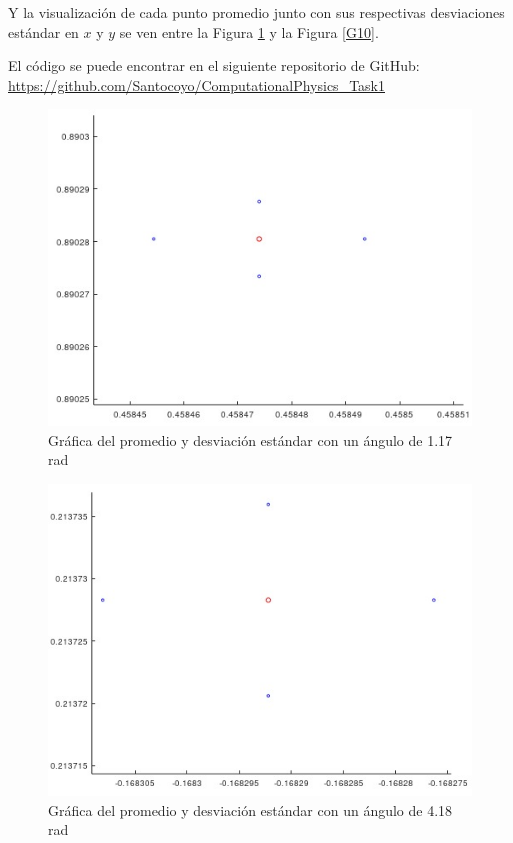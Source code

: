 \documentclass[a4paper, 12pt]{article}
\begin{document}
    Y la visualización de cada punto promedio junto con sus respectivas desviaciones estándar en $x$ y $y$ se ven entre la Figura \ref{G1} y la Figura \ref{G10}.

    El código se puede encontrar en el siguiente repositorio de GitHub: \url{https://github.com/Santocoyo/ComputationalPhysics_Task1}

    \begin{figure}[ht!]
        \centering
        \includegraphics[width=12cm]{img/g1.jpeg}
        \caption{Gráfica del promedio y desviación estándar con un ángulo de 1.17 rad}
        \label{G1}
    \end{figure}

    \begin{figure}[ht!]
        \centering
        \includegraphics[width=12cm]{img/g2.jpeg}
        \caption{Gráfica del promedio y desviación estándar con un ángulo de 4.18 rad}
        \label{G2}
    \end{figure}
\end{document}
